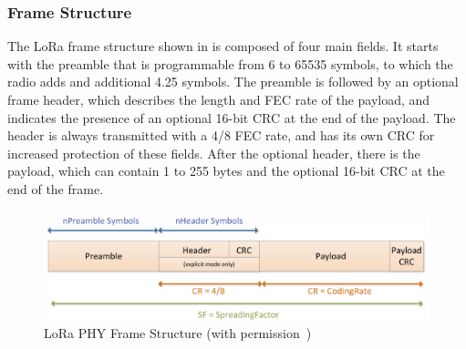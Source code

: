 
\subsubsection{Frame Structure}
The \ac{LoRa} frame structure shown in  is composed of four main
fields. It starts with the preamble that is programmable from 6 to 65535
symbols, to which the radio adds and additional 4.25 symbols. The preamble is
followed by an optional frame header, which describes the length and \ac{FEC}
rate of the payload, and indicates the presence of an optional 16-bit CRC at
the end of the payload. The header is always transmitted with a 4/8 \ac{FEC}
rate, and has its own \ac{CRC} for increased protection of these fields. After
the optional header, there is the payload, which can contain 1 to 255 bytes
and the optional 16-bit \ac{CRC} at the end of the frame.

\begin{figure}
  \centering
  \includegraphics[width=\columnwidth]{figures/frame.png}
  \caption{LoRa PHY Frame Structure (with permission~\cite{SX1276})}
  \label{fig:frame}
\end{figure}

